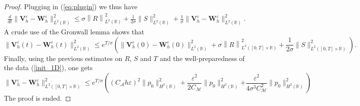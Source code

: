 \documentclass[a4paper,french,english,10pt]{article}
\newcommand\eps{\varepsilon}
\newcommand\V{\mathbf{V}}
\newcommand\W{\mathbf{W}}
\begin{document}
\begin{proof}
Plugging in (\ref{eq:plugin}) 
%
we thus have
\begin{eqnarray*}
 \frac{d}{dt}\|\V_h^{\eps}-\W^\eps_h\|_{L^2(\mathbb R)}
^2 \leq  %
\sigma  \left\| R  \right\|_{L^2(\mathbb R)} ^2 
+ \frac1{2\sigma}\| S \|_{L^2(\mathbb R)}^2 + \frac1\sigma \|\V_h^{\eps}-\W^\eps_h\|_{L^2(\mathbb R)}
^2 .
\end{eqnarray*}
A crude use of the  Gronwall lemma shows that 
\begin{equation*}
\|\V_h^{\eps}(t)-\W^\eps_h(t)\|_{L^2(\mathbb R)}^2 \leq 
  e^{T/\sigma }  \left(  \|\V_h^{\eps}(0)-\W^\eps_h(0)\|_{L^2(\mathbb R)}^2 
+\sigma   \left\| R  \right\|_{L^2([0,T]\times \mathbb R)} ^2 
+ \frac1{2\sigma}\| S \|_{L^2([0,T]\times\mathbb R)}^2 
  \right).
\end{equation*}
Finally, using the previous estimates on $R$, $S$ and $T$
and the well-preparedness of the data (\ref{init_1D}), one gets
$$
\|\V_h^{\eps}-\W^\eps_h\|_{L^2([0,T]\times\mathbb{R})}^2 \leq 
e^{T/\sigma }  \left(  (C_\mathcal A h \eps  )^2\|p_0\|_{H^2(\mathbb{R})} ^2+
   \frac{\eps^2 }{ {2 C_{\mathcal{M}} } }  
\| p_0\|_{H^2(\mathbb{R})}^2
\right.
\left.
+%
 \frac{ \eps ^2}{4\sigma ^3C_\mathcal M^2}  %
\| p_0\|_{H^2(\mathbb{R})}^2 
\right)
$$
The proof is ended.
\end{proof} 
\end{document}
